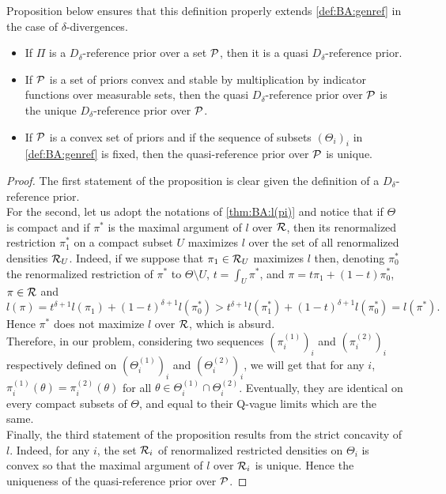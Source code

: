 Proposition below ensures that this definition properly extends \cref{def:BA:genref} in the case of $\delta$-divergences.
\begin{prop}\label{prop:quasi}
     \begin{itemize}
        \item If $\varPi$ is a $D_\delta$-reference prior over a set $\mathcal{P}$, then it is a quasi $D_\delta$-reference prior.
        \item If $\mathcal{P}$ is a set of priors convex and stable by multiplication by indicator functions over measurable sets, then the quasi $D_\delta$-reference prior over $\mathcal{P}$ is the unique $D_\delta$-reference prior over $\mathcal{P}$.
        \item If $\mathcal{P}$ is a convex set of priors and if the sequence of subsets $(\Theta_i)_i$ in \cref{def:BA:genref} is fixed, then the quasi-reference prior over $\mathcal{P}$ is unique.
    \end{itemize}
\end{prop}


\begin{proof}
    The first statement of the proposition is clear given the definition of a $D_\delta$-reference prior.\\
    For the second, let us adopt the notations of \cref{thm:BA:l(pi)} and  notice that if $\Theta$ is compact and if $\pi^\ast$ is the maximal argument of $l$ over $\mathcal{R}$, then its renormalized restriction $\pi_1^\ast$ on a compact subset $U$ maximizes $l$ over the set of all renormalized densities $\mathcal{R}_U$.
    Indeed, if we suppose that $\pi_1\in\mathcal{R}_U$ maximizes $l$ then, denoting $\pi_0^\ast$ the renormalized restriction of $\pi^\ast$ to $\Theta\setminus U$, $t=\int_U\pi^\ast$, and $\pi = t\pi_1+(1-t)\pi_0^\ast$, $\pi\in\mathcal{R}$ and
        \begin{equation}
            l(\pi) = t^{\delta+1}l(\pi_1) + (1-t)^{\delta+1}l(\pi_0^\ast) > t^{\delta+1}l(\pi_1^\ast) + (1-t)^{\delta+1}l(\pi_0^\ast) = l(\pi^\ast).
        \end{equation}
    Hence $\pi^\ast$ does not maximize $l$ over $\mathcal{R}$, which is absurd.\\
    Therefore, in our problem, considering two sequences $(\pi^{(1)}_i)_i$ and $(\pi_i^{(2)})_i$ respectively defined on $(\Theta_i^{(1)})_i$ and $(\Theta^{(2)}_i)_i$, we will get that for any $i$, $\pi^{(1)}_i(\theta)=\pi_i^{(2)}(\theta)$ for all $\theta\in\Theta_i^{(1)}\cap\Theta_i^{(2)}$. Eventually, they are identical on every compact subsets of $\Theta$, and equal to their Q-vague limits which are the same.\\
    Finally, the third statement of the proposition results from the strict concavity of $l$. Indeed, for any $i$, the set $\mathcal{R}_i$ of renormalized restricted densities on $\Theta_i$ is convex so that the maximal argument of $l$ over $\mathcal{R}_i$ is unique. Hence the uniqueness of the quasi-reference prior over $\mathcal{P}$.
\end{proof}
    



